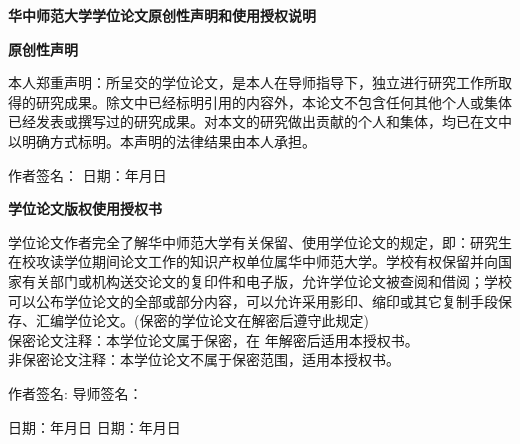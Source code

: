 \begin{center}
{\bfseries{}\kaishu
华中师范大学学位论文原创性声明和使用授权说明}

\parbox[t][1.4cm][c]{\textwidth}{\centering\bfseries{}\kaishu 原创性声明}

\parbox[t][2.8cm][c]{\textwidth}{
\hspace{2em}本人郑重声明：所呈交的学位论文，是本人在导师指导下，独立进行研究工作所取得的研究成果。除文中已经标明引用的内容外，本论文不包含任何其他个人或集体已经发表或撰写过的研究成果。对本文的研究做出贡献的个人和集体，均已在文中以明确方式标明。本声明的法律结果由本人承担。}
\parbox[t][1.2cm][c]{\textwidth}{
\hspace{2em}\fangsong
作者签名：\hspace*{5.4cm} 日期：\underline{\hspace{3em}}年\underline{\hspace{2em}}月\underline{\hspace{2em}}日}

\parbox[t][1.4cm][c]{\textwidth}{\centering{}\bfseries\kaishu 学位论文版权使用授权书}

\parbox[t][5cm][c]{\textwidth}{
\hspace{2em}学位论文作者完全了解华中师范大学有关保留、使用学位论文的规定，即：研究生在校攻读学位期间论文工作的知识产权单位属华中师范大学。学校有权保留并向国家有关部门或机构送交论文的复印件和电子版，允许学位论文被查阅和借阅；学校可以公布学位论文的全部或部分内容，可以允许采用影印、缩印或其它复制手段保存、汇编学位论文。(保密的学位论文在解密后遵守此规定)\\
保密论文注释：本学位论文属于保密，在 \underline{\hspace{3em}}年解密后适用本授权书。\\
非保密论文注释：本学位论文不属于保密范围，适用本授权书。}

\parbox[t][1.8cm][c]{\textwidth}{\fangsong
\hspace{2em}作者签名: \hspace*{5.4cm} 导师签名：}
\parbox[t][0.1cm][c]{\textwidth}{\fangsong
\hspace{2em}日期：\underline{\hspace{3em}}年\underline{\hspace{2em}}月\underline{\hspace{2em}}日
\hspace*{1.5cm}日期：\underline{\hspace{3em}}年\underline{\hspace{2em}}月\underline{\hspace{2em}}日}


\end{center}
